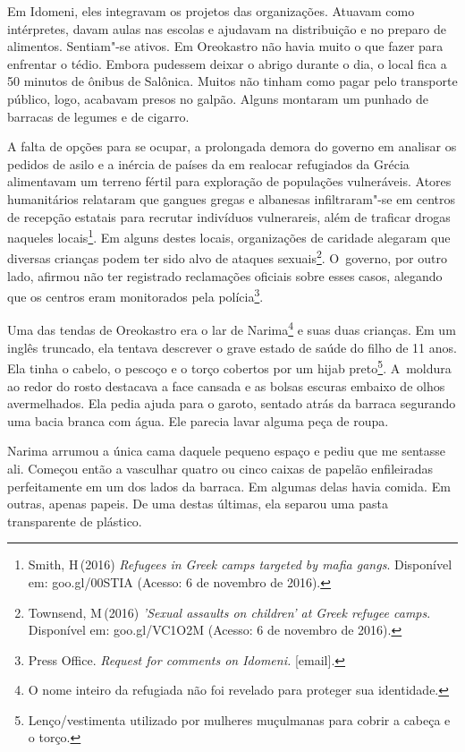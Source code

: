 Em Idomeni, eles integravam os projetos das organizações. Atuavam como
intérpretes, davam aulas nas escolas e ajudavam na distribuição e no
preparo de alimentos. Sentiam"-se ativos. Em Oreokastro não havia muito o
que fazer para enfrentar o tédio. Embora pudessem deixar o abrigo
durante o dia, o local fica a 50 minutos de ônibus de Salônica. Muitos
não tinham como pagar pelo transporte público, logo, acabavam presos no
galpão. Alguns montaram um punhado de barracas de legumes e de cigarro.

A falta de opções para se ocupar, a prolongada demora do governo em
analisar os pedidos de asilo e a inércia de países da  em realocar
refugiados da Grécia alimentavam um terreno fértil para exploração de
populações vulneráveis. Atores humanitários relataram que gangues gregas
e albanesas infiltraram"-se em centros de recepção estatais para recrutar
indivíduos vulnerareis, além de traficar drogas naqueles
locais\footnote{ Smith, H\,(2016) \emph{Refugees in Greek camps
targeted by mafia gangs}. Disponível em:
goo.gl/00STIA
(Acesso: 6 de novembro de 2016).}. Em alguns destes locais, organizações de
caridade alegaram que diversas crianças podem ter sido alvo de ataques
sexuais\footnote{ Townsend, M\,(2016) \emph{'Sexual assaults on
children' at Greek refugee camps}. Disponível em:
goo.gl/VC1O2M
(Acesso: 6 de novembro de 2016).}. O~governo, por outro lado, afirmou não ter registrado
reclamações oficiais sobre esses casos, alegando que os centros eram 
monitorados pela polícia\footnote{ Press Office. \emph{Request for comments on
Idomeni}\emph{.} {[}email{]}.}.

Uma das tendas de Oreokastro era o lar de Narima\footnote{ O nome inteiro da refugiada não foi revelado para
proteger sua identidade.}  e
suas duas crianças. Em um inglês truncado, ela tentava descrever o
grave estado de saúde do filho de 11 anos. Ela tinha o cabelo, o pescoço
e o torço cobertos por um hijab preto\footnote{ Lenço/vestimenta utilizado por mulheres
muçulmanas para cobrir a cabeça e o torço.}. A~moldura
ao redor do rosto destacava a face cansada e as bolsas escuras embaixo
de olhos avermelhados. Ela pedia ajuda para o garoto, sentado atrás da
barraca segurando uma bacia branca com água. Ele parecia lavar alguma peça
de roupa.

Narima arrumou a única cama daquele pequeno espaço e pediu que me
sentasse ali. Começou então a vasculhar quatro ou cinco caixas de
papelão enfileiradas perfeitamente em um dos lados da barraca. Em
algumas delas havia comida. Em outras, apenas papeis. De uma destas
últimas, ela separou uma pasta transparente de plástico.


